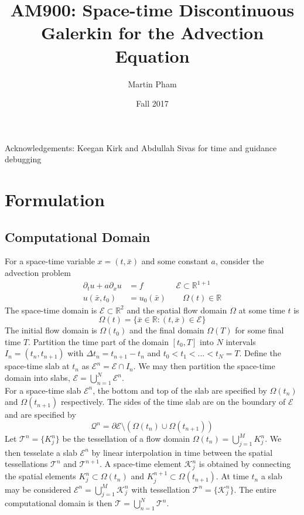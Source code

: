 \documentclass[11pt, oneside]{article}   	%
\title{AM900: Space-time Discontinuous Galerkin for the Advection Equation}
\author{Martin Pham}
\date{Fall 2017}							%
\begin{document}
\maketitle

\begin{center}
Acknowledgements: Keegan Kirk and Abdullah Sivas for time and guidance debugging
\end{center}

\section{Formulation}
%
%
\subsection{Computational Domain}
For a space-time variable $x = (t,\bar{x})$ and some constant $a$, consider the advection problem
\begin{equation} \label{og_prob}
\begin{split}
\partial_t u + a \partial_x u &= f \qquad\qquad \mathcal{E} \subset \mathbb{R}^{1+1}\\
u(\bar{x}, t_0) &= u_{0}(\bar{x}) \qquad \Omega(t) \in \mathbb{R}
\end{split}
\end{equation}
The space-time domain is $\mathcal{E} \subset \mathbb{R}^2$ and the spatial flow domain $\Omega$ at some time $t$ is
\[\Omega(t) = \{ \bar{x} \in \mathbb{R} : (t,\bar{x}) \in \mathcal{E}\}\]
The initial flow domain is $\Omega(t_0)$ and the final domain $\Omega(T)$ for some final time $T$.
Partition the time part of the domain $[t_0,T]$ into $N$ intervals $I_n = (t_n, t_{n+1})$ with $\Delta t_n = t_{n+1} - t_n$ and  $t_0 < t_1 < ... < t_N = T$.
Define the space-time slab at $t_n$ as $\mathcal{E}^n = \mathcal{E} \cap I_n$.
We may then partition the space-time domain into slabs, $\mathcal{E} = \bigcup_{n=1}^{N} \mathcal{E}^n$.\\
For a space-time slab $\mathcal{E}^n$, the bottom and top of the slab are specified by $\Omega(t_n)$ and $\Omega(t_{n+1})$ respectively.
The sides of the time slab are on the boundary of $\mathcal{E}$ and are specified by 
\[\mathcal{Q}^n = \partial \mathcal{E} \setminus (\Omega(t_n) \cup \Omega(t_{n+1}))\]
Let $\mathcal{T}^n = \{K_j^n\}$ be the tessellation of a flow domain $\Omega(t_n) = \bigcup_{j=1}^{M} K_j^n$.
We then tesselate a slab $\mathcal{E}^n$ by linear interpolation in time between the spatial tessellations $\mathcal{T}^n$ and $\mathcal{T}^{n+1}$.
A space-time element $\mathcal{K}_j^n$ is obtained by connecting the spatial elements $K_j^n \subset \Omega(t_n)$ and $K_j^{n+1} \subset \Omega(t_{n+1})$.
At time $t_n$  a slab may be considered $\mathcal{E}^n = \bigcup_{j=1}^{M} \mathcal{K}_j^n$ with tessellation $\mathcal{T}^n = \{\mathcal{K}_j^n\}$.
The entire computational domain is then  $\mathcal{T} = \bigcup_{n=1}^{N} \mathcal{T}^n$.
\end{document}
